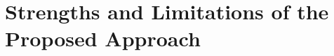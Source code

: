 \documentclass[lettersize,journal]{IEEEtran}
\begin{document}


\section{Strengths and Limitations of the Proposed Approach}
\label{strengths_and_limitations}




\end{document}

